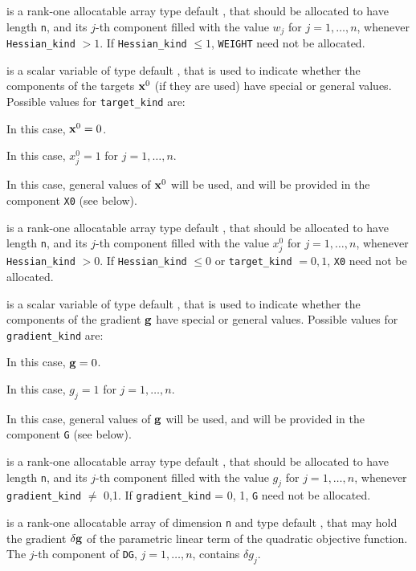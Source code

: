 \documentclass{galahad}
\begin{document}
\begin{description}
 is a rank-one allocatable array type default \realdp, that 
should be allocated to have length {\tt n}, and its $j$-th component 
filled with the value $w_{j}$ for $j = 1, \ldots , n$, 
whenever {\tt Hessian\_kind} $>1$.
If {\tt Hessian\_kind} $\leq 1$, {\tt WEIGHT} need not be allocated.

 is a scalar variable of type default \integer, 
that is used to indicate whether the components of the targets ${\mathbf{x}}^0$ 
(if they are used) have special or general values. Possible values for 
{\tt target\_kind} are:
\begin{description}
  In this case, ${\mathbf{x}}^0 = 0$.

 In this case, $x^0_{j} = 1$ for $j = 1, \ldots , n$.

 In this case, general values of ${\mathbf{x}}^0$ will be used,
     and will be provided in the component {\tt X0} (see below).
\end{description}

 is a rank-one allocatable array type default \realdp, that 
should be allocated to have length {\tt n}, and its $j$-th component 
filled with the value $x_{j}^0$ for $j = 1, \ldots , n$, 
whenever {\tt Hessian\_kind} $>0$.
If {\tt Hessian\_kind} $\leq 0$  or {\tt target\_kind} $= 0,1$,
{\tt X0} need not be allocated.

 is a scalar variable of type default \integer, 
that is used to indicate whether the components of the gradient ${\mathbf{g}}$ 
have special or general values. Possible values for {\tt gradient\_kind} are:
\begin{description}
  In this case, ${\mathbf{g}} = 0$.

 In this case, $g_{j} = 1$ for $j = 1, \ldots , n$.

 In this case, general values of ${\mathbf{g}}$ will be used,
     and will be provided in the component {\tt G} (see below).
\end{description}

 is a rank-one allocatable array type default \realdp, that 
should be allocated to have length {\tt n}, and its $j$-th component 
filled with the value $g_{j}$ for $j = 1, \ldots , n$, 
whenever {\tt gradient\_kind} $\neq$ 0,1.
If {\tt gradient\_kind} {= 0, 1}, {\tt G} need not be allocated.

 is a rank-one allocatable array of dimension {\tt n} and type 
default \realdp, that may hold the gradient $\delta {\mathbf{g}}$ 
of the parametric linear term of the quadratic objective function.
The $j$-th component of 
{\tt DG}, $j = 1,  \ldots ,  n$, contains $\delta g_{j}$.


\end{description}
\end{document}
